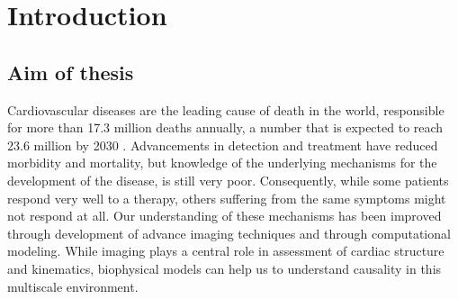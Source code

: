 \chapter{Introduction}







\section{Aim of thesis}
Cardiovascular diseases are the leading cause of death in the
world, responsible for more than 17.3 million deaths annually, a
number that is expected to reach 23.6 million by 2030
\cite{writing2016heart}. Advancements in detection and treatment
have reduced morbidity and mortality, but knowledge of the underlying
mechanisms for the development of the disease, is still very poor.
Consequently, while some patients respond very well to a therapy, others suffering
from the same symptoms might not respond at all.
Our understanding of these mechanisms has been improved through
development of advance imaging techniques and through
computational modeling. While imaging plays a central role in
assessment of cardiac structure and kinematics, biophysical models can
help us to understand causality in this multiscale environment.  


